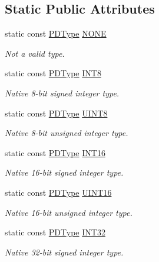 \subsection*{Static Public Attributes}
\begin{DoxyCompactItemize}
\item 
static const \hyperlink{class_h5_t_l_1_1_p_d_type}{P\-D\-Type} \hyperlink{class_h5_t_l_1_1_d_type_a6a438fe2e5e351a7a5f25deb4637f908}{N\-O\-N\-E}
\begin{DoxyCompactList}\small\item\em Not a valid type. \end{DoxyCompactList}\item 
static const \hyperlink{class_h5_t_l_1_1_p_d_type}{P\-D\-Type} \hyperlink{class_h5_t_l_1_1_d_type_ac2a6c1610fcc3d1a56ba67bff203f5e8}{I\-N\-T8}
\begin{DoxyCompactList}\small\item\em Native 8-\/bit signed integer type. \end{DoxyCompactList}\item 
static const \hyperlink{class_h5_t_l_1_1_p_d_type}{P\-D\-Type} \hyperlink{class_h5_t_l_1_1_d_type_a6e37c76bcf8cea8511e8ef6fbafb269b}{U\-I\-N\-T8}
\begin{DoxyCompactList}\small\item\em Native 8-\/bit unsigned integer type. \end{DoxyCompactList}\item 
static const \hyperlink{class_h5_t_l_1_1_p_d_type}{P\-D\-Type} \hyperlink{class_h5_t_l_1_1_d_type_a4f605ac6c7ba995aa5cc7f8b4b634029}{I\-N\-T16}
\begin{DoxyCompactList}\small\item\em Native 16-\/bit signed integer type. \end{DoxyCompactList}\item 
static const \hyperlink{class_h5_t_l_1_1_p_d_type}{P\-D\-Type} \hyperlink{class_h5_t_l_1_1_d_type_a95cecc3c8350b6088acbc497a89c3c10}{U\-I\-N\-T16}
\begin{DoxyCompactList}\small\item\em Native 16-\/bit unsigned integer type. \end{DoxyCompactList}\item 
static const \hyperlink{class_h5_t_l_1_1_p_d_type}{P\-D\-Type} \hyperlink{class_h5_t_l_1_1_d_type_aeac9765985f2a8195e30a84c3b23af9f}{I\-N\-T32}
\begin{DoxyCompactList}\small\item\em Native 32-\/bit signed integer type. \end{DoxyCompactList}\item 

\end{DoxyCompactItemize}
